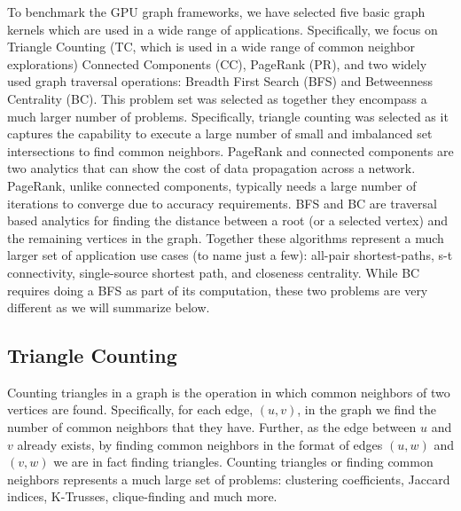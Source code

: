 
To benchmark the GPU graph frameworks, we have selected five basic graph kernels which are used in a wide range of applications. Specifically, we focus on Triangle Counting (TC, which is used in a wide range of common neighbor explorations) Connected Components (CC), PageRank (PR), and two widely used graph traversal operations: Breadth First Search (BFS) and Betweenness Centrality (BC). This problem set was selected as together they encompass a much larger number of problems. 
Specifically, triangle counting was selected as it captures the capability to execute a large number of small and imbalanced set intersections to find common neighbors. PageRank and connected components are two analytics that can show the cost of data propagation across a network. PageRank, unlike connected components, typically needs a large number of iterations to converge due to accuracy requirements. BFS and BC are traversal based analytics for finding the distance between a root (or a selected vertex) and the remaining vertices in the graph. Together these algorithms represent a much larger set of application use cases (to name just a few): all-pair shortest-paths, s-t connectivity, single-source shortest path, and closeness centrality. While BC requires doing a BFS as part of its computation, these two problems are very different as we will summarize below. 



\subsection{Triangle Counting}
Counting triangles in a graph is the operation in which common neighbors of two vertices are found. Specifically, for each edge, $(u,v)$, in the graph we find the number of common neighbors that they have. Further, as the edge between $u$ and $v$ already exists, by finding common neighbors in the format of edges $(u,w)$ and $(v,w)$ we are in fact finding triangles. 
Counting triangles or finding common neighbors represents a much large set of problems: clustering coefficients, Jaccard indices, K-Trusses, clique-finding and much more.

